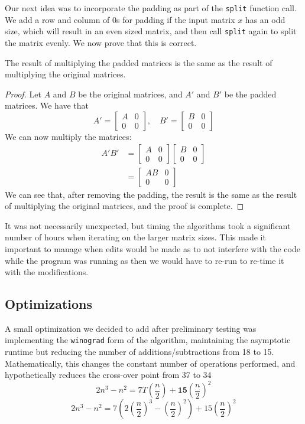 \documentclass[11pt]{scrartcl}
\theoremstyle{dotlessP}
\theoremstyle{dotlessN}
\theoremstyle{dotN}
\begin{document}
Our next idea was to incorporate the padding as part of the \texttt{split} function call. We add a row and column of 0s for padding if the input matrix $x$ has an odd size, which will result in an even sized matrix, and then call \texttt{split} again to split the matrix evenly. We now prove that this is correct.
\begin{claim}
   The result of multiplying the padded matrices is the same as the result of multiplying the original matrices.
\end{claim}
\begin{proof}
    Let $A$ and $B$ be the original matrices, and $A'$ and $B'$ be the padded matrices. We have that
    \[
    A' = \begin{bmatrix}
        A & 0 \\
        0 & 0
    \end{bmatrix}, \quad B' = \begin{bmatrix}
        B & 0 \\
        0 & 0
    \end{bmatrix}
    \] 
    We can now multiply the matrices:
    \begin{align*}
        A'B' &= \begin{bmatrix}
            A & 0 \\
            0 & 0
        \end{bmatrix}\begin{bmatrix}
            B & 0 \\
            0 & 0
        \end{bmatrix} \\
             &= \begin{bmatrix}
                 AB & 0 \\
                 0 & 0
             \end{bmatrix}
    \end{align*}
    We can see that, after removing the padding, the result is the same as the result of multiplying the original
    matrices, and the proof is complete.
\end{proof}

It was not necessarily unexpected, but timing the algorithms took a significant number of hours when iterating on the larger matrix sizes. This made it important to manage when edits would be made as to not interfere with the code while the program was running as then we would have to re-run to re-time it with the modifications.  \\

\subsection{Optimizations}
A small optimization we decided to add after preliminary testing was implementing the \texttt{winograd} form of the algorithm, maintaining the asymptotic runtime but reducing the number of additions/subtractions from 18 to 15. Mathematically, this changes the constant number of operations performed, and hypothetically reduces the cross-over point from 37 to 34\
\[2n^3 - n^2 = 7T(\frac{n}{2})+\textbf{15}(\frac{n}{2})^2\]
\[2n^3-n^2 = 7(2(\frac{n}{2})^3-(\frac{n}{2})^2)+15(\frac{n}{2})^2\]\\
\end{document}
